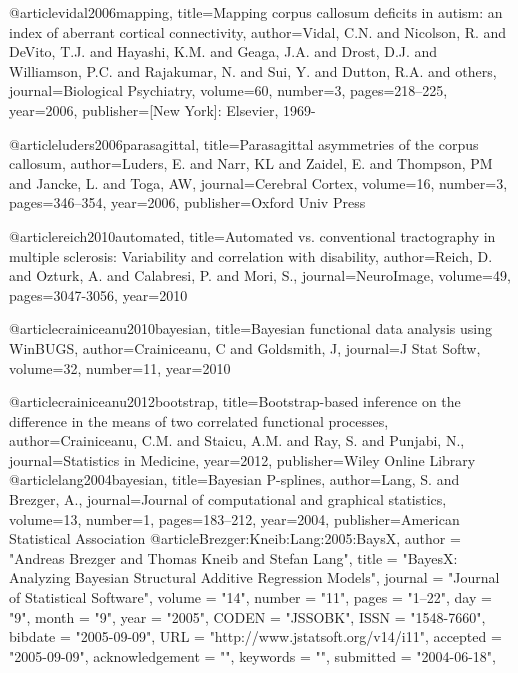@article{vidal2006mapping,
  title={Mapping corpus callosum deficits in autism: an index of aberrant cortical connectivity},
  author={Vidal, C.N. and Nicolson, R. and DeVito, T.J. and Hayashi, K.M. and Geaga, J.A. and Drost, D.J. and Williamson, P.C. and Rajakumar, N. and Sui, Y. and Dutton, R.A. and others},
  journal={Biological Psychiatry},
  volume={60},
  number={3},
  pages={218--225},
  year={2006},
  publisher={[New York]: Elsevier, 1969-}
}

@article{luders2006parasagittal,
  title={Parasagittal asymmetries of the corpus callosum},
  author={Luders, E. and Narr, KL and Zaidel, E. and Thompson, PM and Jancke, L. and Toga, AW},
  journal={Cerebral Cortex},
  volume={16},
  number={3},
  pages={346--354},
  year={2006},
  publisher={Oxford Univ Press}
}

@article{reich2010automated,
  title={Automated vs. conventional tractography in multiple sclerosis: Variability and
correlation with disability},
  author={Reich, D. and Ozturk, A. and Calabresi, P. and Mori, S.},
  journal={NeuroImage},
  volume={49},
  pages={3047-3056},
  year={2010}
}

@article{crainiceanu2010bayesian,
  title={Bayesian functional data analysis using WinBUGS},
  author={Crainiceanu, C and Goldsmith, J},
  journal={J Stat Softw},
  volume={32},
  number={11},
  year={2010}
}

@article{crainiceanu2012bootstrap,
  title={Bootstrap-based inference on the difference in the means of two correlated functional processes},
  author={Crainiceanu, C.M. and Staicu, A.M. and Ray, S. and Punjabi, N.},
  journal={Statistics in Medicine},
  year={2012},
  publisher={Wiley Online Library}
}
@article{lang2004bayesian,
  title={Bayesian P-splines},
  author={Lang, S. and Brezger, A.},
  journal={Journal of computational and graphical statistics},
  volume={13},
  number={1},
  pages={183--212},
  year={2004},
  publisher={American Statistical Association}
}
@article{Brezger:Kneib:Lang:2005:BaysX,
  author =	"Andreas Brezger and Thomas Kneib and Stefan Lang",
  title =	"BayesX: Analyzing Bayesian Structural Additive Regression Models",
  journal =	"Journal of Statistical Software",
  volume =	"14",
  number =	"11",
  pages =	"1--22",
  day =  	"9",
  month =	"9",
  year = 	"2005",
  CODEN =	"JSSOBK",
  ISSN = 	"1548-7660",
  bibdate =	"2005-09-09",
  URL =  	"http://www.jstatsoft.org/v14/i11",
  accepted =	"2005-09-09",
  acknowledgement = "",
  keywords =	"",
  submitted =	"2004-06-18",
}
